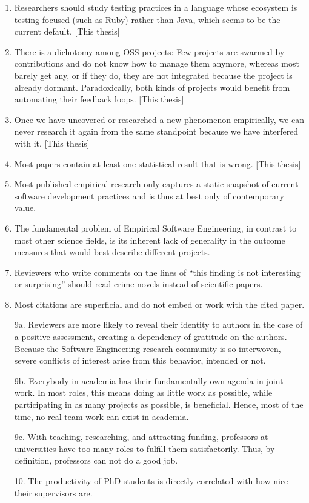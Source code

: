 \documentclass{dissertation}
\begin{document}
\begin{enumerate}
\item Researchers should study testing practices in a language whose ecosystem is testing-focused
  (such as Ruby) rather than Java, which seems to be the current default. [This thesis]
\item There is a dichotomy among OSS projects: Few projects are swarmed by contributions and do not
  know how to manage them anymore, whereas most barely get any, or if they do, they are not
  integrated because the project is already dormant. Paradoxically, both kinds of projects would
  benefit from automating their feedback loops. [This thesis]
\item Once we have uncovered or researched a new phenomenon empirically, we can never research it
  again from the same standpoint because we have interfered with it. [This thesis]
\item Most papers contain at least one statistical result that is wrong. [This thesis]
\item Most published empirical research only captures a static snapshot of current software
  development practices and is thus at best only of contemporary value.
\item The fundamental problem of Empirical Software Engineering, in contrast to most other science
  fields, is its inherent lack of generality in the outcome measures that would best describe
  different projects.
\item Reviewers who write comments on the lines of ``this finding is not interesting or
  surprising'' should read crime novels instead of scientific papers.
\item Most citations are superficial and do not embed or work with the cited paper.
  \newpage
\item[9a.] Reviewers are more likely to reveal their identity to authors in the case of a positive
  assessment, creating a dependency of gratitude on the authors. Because the Software Engineering
  research community is so interwoven, severe conflicts of interest arise from this behavior,
  intended or not.
\item[9b.] Everybody in academia has their fundamentally own agenda in joint work. In most roles,
  this means doing as little work as possible, while participating in as many projects as possible,
  is beneficial. Hence, most of the time, no real team work can exist in academia.
\item[9c.] With teaching, researching, and attracting funding, professors at universities have too
  many roles to fulfill them satisfactorily. Thus, by definition, professors can not do a good job.
\item[10.] The productivity of PhD students is directly correlated with how nice their supervisors
  are.
\end{enumerate}
\end{document}
